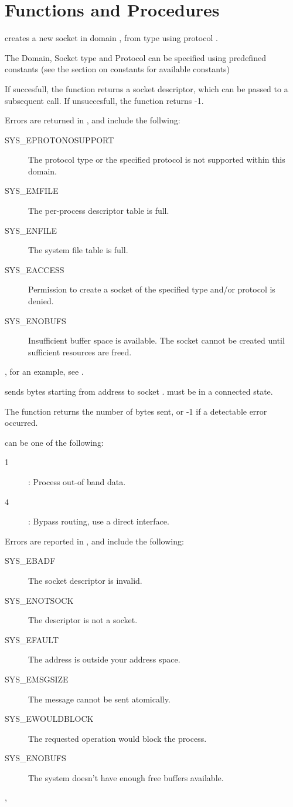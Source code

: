 \section {Functions and Procedures}

{ creates a new socket in domain , from type
 using protocol .

The Domain, Socket type and Protocol can be specified using predefined
constants (see the section on constants for available constants)

If succesfull, the function returns a socket descriptor, which can be passed
to a subsequent  call. If unsuccesfull, the function returns -1.
}
{Errors are returned in , and include the follwing:
\begin{description}
\item[SYS\_EPROTONOSUPPORT]
The protocol type or the specified protocol is not
supported within this domain.
\item[SYS\_EMFILE]
The per-process descriptor table is full.
\item[SYS\_ENFILE]
The system file table is full.
\item[SYS\_EACCESS]
 Permission  to  create  a  socket of the specified
 type and/or protocol is denied.
\item[SYS\_ENOBUFS]
 Insufficient  buffer  space  is  available.    The
 socket   cannot   be   created   until  sufficient
 resources are freed.
\end{description}}
{, }
for an example, see .
{ sends  bytes starting from address 
to socket .  must be in a connected state.

The function returns the number of bytes sent, or -1 if a detectable 
error occurred.

 can be one of the following:
\begin{description}
\item [1] : Process out-of band data.
\item [4] : Bypass routing, use a direct interface.
\end{description}
}
{Errors are reported in , and include the following:
\begin{description}
\item[SYS\_EBADF] The socket descriptor is invalid.
\item[SYS\_ENOTSOCK] The descriptor is not a socket.
\item[SYS\_EFAULT] The address is outside your address space.
\item[SYS\_EMSGSIZE] The message cannot be sent atomically.
\item[SYS\_EWOULDBLOCK] The requested operation would block the process.
\item[SYS\_ENOBUFS] The system doesn't have enough free buffers available.
\end{description}
}{, }

